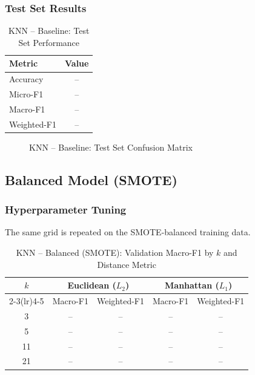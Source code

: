 \documentclass[12pt,a4paper]{article}
\begin{document}
\subsubsection{Test Set Results}

\begin{table}[H]
    \centering
    \caption{KNN -- Baseline: Test Set Performance}
    \label{tab:knn_baseline_test}
    \begin{tabular}{lc}
        \toprule
        \textbf{Metric} & \textbf{Value} \\
        \midrule
        Accuracy    & -- \\
        Micro-F1    & -- \\
        Macro-F1    & -- \\
        Weighted-F1 & -- \\
        \bottomrule
    \end{tabular}
\end{table}

\begin{figure}[H]
    \centering
    \caption{KNN -- Baseline: Test Set Confusion Matrix}
    \label{fig:knn_baseline_cm}
\end{figure}

\subsection{Balanced Model (SMOTE)}

\subsubsection{Hyperparameter Tuning}

The same grid is repeated on the SMOTE-balanced training data.

\begin{table}[H]
    \centering
    \caption{KNN -- Balanced (SMOTE): Validation Macro-F1 by $k$ and Distance Metric}
    \label{tab:knn_balanced_tuning}
    \begin{tabular}{ccccc}
        \toprule
        \multirow{2}{*}{$k$} & \multicolumn{2}{c}{Euclidean ($L_2$)} & \multicolumn{2}{c}{Manhattan ($L_1$)} \\
        \cmidrule(lr){2-3}\cmidrule(lr){4-5}
         & Macro-F1 & Weighted-F1 & Macro-F1 & Weighted-F1 \\
        \midrule
        3  & -- & -- & -- & -- \\
        5  & -- & -- & -- & -- \\
        11 & -- & -- & -- & -- \\
        21 & -- & -- & -- & -- \\
        \bottomrule
    \end{tabular}
\end{table}
\end{document}

